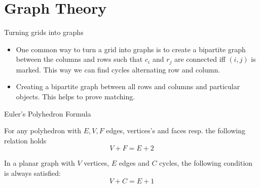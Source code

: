 \graphicspath{{Pics/combi/graph/}}

\newpage
\section{Graph Theory}

\begin{take_note*}{Turning grids into graphs} 
    \begin{itemize} 
        \item One common way to turn a grid into graphs is to create a
            bipartite graph between the columns and rows such that $ c_i $ and
            $ r_j $ are connected iff $ (i, j) $ is marked. This way we can
            find cycles alternating row and column.
        \item Creating a bipartite graph between all rows and columns and
            particular objects. This helps to prove matching.  
    \end{itemize}
\end{take_note*}



\begin{multicols}{2} 
    \begin{enumerate}[wide=0em, label=\arabic*, itemsep=0pt, parsep=0pt,
        font=\footnotesize\bfseries]
    \end{enumerate}
\end{multicols}


{Euler's Polyhedron Formula}{
    For any polyhedron with $ E, V, F $ edges, vertices's and faces resp. the
    following relation holds \[V+F=E+2\]\label{lemma:planar_graph_polyhedron} 

    In a planar graph with $ V $ vertices, $ E $ edges and $ C $ cycles, the
    following condition is always satisfied:
    \[V+C=E+1\]\label{theorem:planar_graph_theorem}
}







